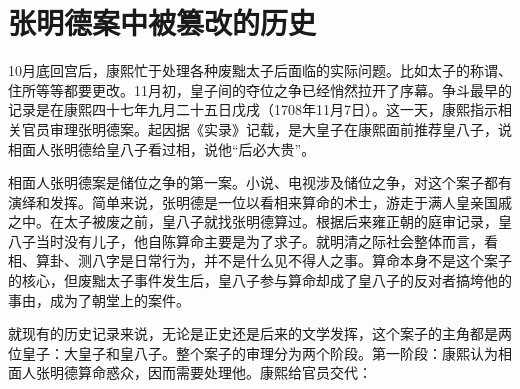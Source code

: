\begin{sectionnotes}










\end{sectionnotes}
\section{张明德案中被篡改的历史}


10月底回宫后，康熙忙于处理各种废黜太子后面临的实际问题。比如太子的称谓、住所等等都要更改。11月初，皇子间的夺位之争已经悄然拉开了序幕。争斗最早的记录是在康熙四十七年九月二十五日戊戌（1708年11月7日）。这一天，康熙指示相关官员审理张明德案。起因据《实录》记载，是大皇子在康熙面前推荐皇八子，说相面人张明德给皇八子看过相，说他“后必大贵”。



相面人张明德案是储位之争的第一案。小说、电视涉及储位之争，对这个案子都有演绎和发挥。简单来说，张明德是一位以看相来算命的术士，游走于满人皇亲国戚之中。在太子被废之前，皇八子就找张明德算过。根据后来雍正朝的庭审记录，皇八子当时没有儿子，他自陈算命主要是为了求子。就明清之际社会整体而言，看相、算卦、测八字是日常行为，并不是什么见不得人之事。算命本身不是这个案子的核心，但废黜太子事件发生后，皇八子参与算命却成了皇八子的反对者搞垮他的事由，成为了朝堂上的案件。



就现有的历史记录来说，无论是正史还是后来的文学发挥，这个案子的主角都是两位皇子：大皇子和皇八子。整个案子的审理分为两个阶段。第一阶段：康熙认为相面人张明德算命惑众，因而需要处理他。康熙给官员交代：


